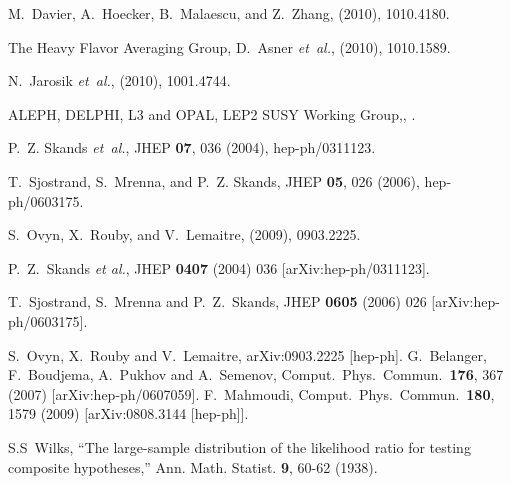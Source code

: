 \begin{thebibliography}{10}
M.~Davier, A.~Hoecker, B.~Malaescu, and Z.~Zhang,
\newblock (2010), 1010.4180.

The Heavy Flavor Averaging Group, D.~Asner {\em et~al.},
\newblock (2010), 1010.1589.

N.~Jarosik {\em et~al.},
\newblock (2010), 1001.4744.

ALEPH, DELPHI, L3 and OPAL, {LEP2 SUSY Working Group,},
.

P.~Z. Skands {\em et~al.},
\newblock JHEP {\bf 07}, 036 (2004), hep-ph/0311123.

T.~Sjostrand, S.~Mrenna, and P.~Z. Skands,
\newblock JHEP {\bf 05}, 026 (2006), hep-ph/0603175.

S.~Ovyn, X.~Rouby, and V.~Lemaitre,
\newblock (2009), 0903.2225.

  P.~Z.~Skands {\it et al.},
  JHEP {\bf 0407} (2004) 036
  [arXiv:hep-ph/0311123].

  T.~Sjostrand, S.~Mrenna and P.~Z.~Skands,
  JHEP {\bf 0605} (2006) 026
  [arXiv:hep-ph/0603175].

  S.~Ovyn, X.~Rouby and V.~Lemaitre,
  arXiv:0903.2225 [hep-ph].
%
  G.~Belanger, F.~Boudjema, A.~Pukhov and A.~Semenov,
  Comput.\ Phys.\ Commun.\  {\bf 176}, 367 (2007)
  [arXiv:hep-ph/0607059].
%
  F.~Mahmoudi,
  Comput.\ Phys.\ Commun.\  {\bf 180}, 1579 (2009)
  [arXiv:0808.3144 [hep-ph]].
%

S.S~Wilks, ``The large-sample distribution of the likelihood ratio for testing composite hypotheses,'' Ann. Math. Statist. {\bf 9}, 60-62 (1938).
	

\end{thebibliography}
